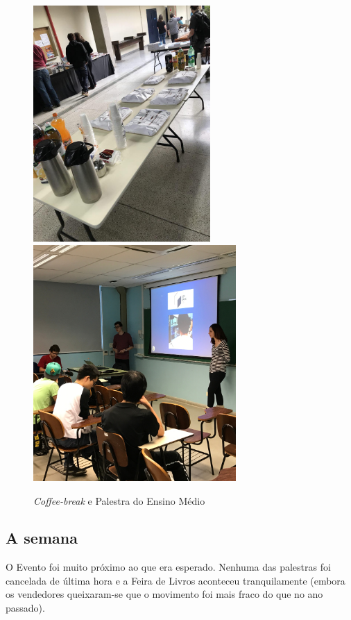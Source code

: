 \documentclass[12pt,letterpaper]{article}
\begin{document}
	\begin{figure}
		\begin{center}
			\includegraphics[height=9cm]{comida.jpg}  
			\includegraphics[height=9cm]{em2.jpg}
			\caption{\textit{Coffee-break} e Palestra do Ensino Médio} 
		\end{center}
	\end{figure}
	
	\subsection{A semana}
	
	O Evento foi muito próximo ao que era esperado. Nenhuma das palestras foi cancelada de última hora e a Feira de Livros aconteceu tranquilamente (embora os vendedores queixaram-se que o movimento foi mais fraco do que no ano passado).
	
\end{document}
